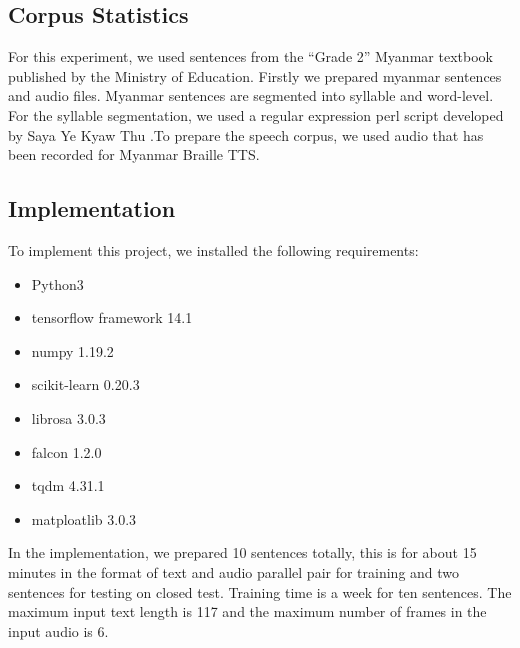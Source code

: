 \documentclass[journal,transmag]{JIISTjrnl}
\newcommand{\quotes}[1]{``#1''}
\begin{document}
\subsection{Corpus Statistics}
For this experiment, we used sentences from the \quotes{Grade 2} Myanmar textbook published by the Ministry of Education. Firstly we prepared myanmar sentences and audio files. Myanmar sentences are segmented into syllable and word-level. For the syllable segmentation, we used a regular expression perl script developed by Saya Ye Kyaw Thu \cite{b7}.To prepare the speech corpus, we used audio that has been recorded for Myanmar Braille TTS. 
\subsection{Implementation}
To implement this project, we installed the following requirements:
\begin{itemize}
	\item 	Python3
	\item 	tensorflow framework  14.1 
	\item	numpy 1.19.2 
	\item	scikit-learn 0.20.3
	\item	librosa 3.0.3
	\item	falcon 1.2.0
	\item	tqdm  4.31.1
	\item	matploatlib 3.0.3
\end{itemize}
In the implementation, we prepared 10 sentences totally, this is for about 15 minutes in the format of text and audio parallel pair for training and two sentences for testing on closed test. Training time is a week for ten sentences. The maximum input text length is 117 and the maximum number of frames in the input audio is 6.
\end{document}
